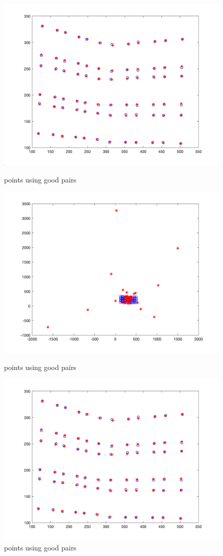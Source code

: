\documentclass{article}
\begin{document}
\begin{figure}[H]
\centering
\includegraphics[scale=0.2]{Good.png}
\caption{points using good pairs}
\label{fig:label}
\centering
\includegraphics[scale=0.2]{Bad.png}
\caption{points using good pairs}
\label{fig:label}
\centering
\includegraphics[scale=0.2]{RANSAC.png}
\caption{points using good pairs}
\label{fig:label}
\end{figure}
\end{document}
